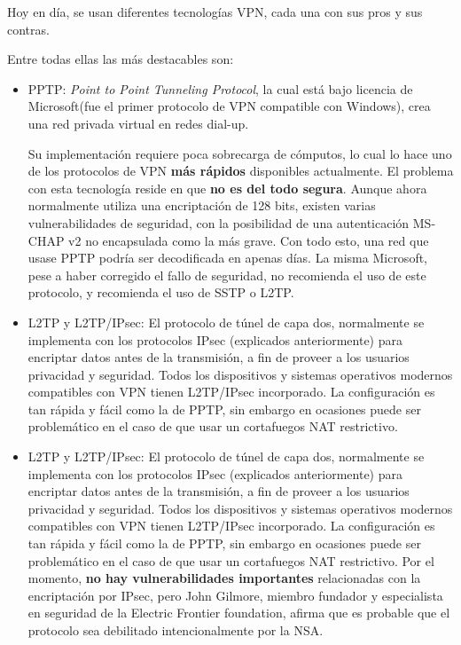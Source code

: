  Hoy en día, se usan diferentes tecnologías VPN, cada una con sus pros y sus contras.
 
 Entre todas ellas las más destacables son:
 
 \begin{itemize}
 	\item PPTP: \textit{Point to Point Tunneling Protocol}, la cual está bajo licencia de Microsoft(fue el primer protocolo de VPN compatible con Windows), crea una red privada virtual en redes dial-up. 
 	
 	Su implementación requiere poca sobrecarga de cómputos, lo cual lo hace uno de los protocolos de VPN \textbf{más rápidos} disponibles actualmente.
 	El problema con esta tecnología reside en que \textbf{no es del todo segura}. Aunque ahora normalmente utiliza una encriptación de 128 bits, existen varias vulnerabilidades de seguridad, con la posibilidad de una autenticación MS-CHAP v2 no encapsulada como la más grave. Con todo esto, una red que usase PPTP podría ser decodificada en apenas días.
 	La misma Microsoft, pese a haber corregido el fallo de seguridad, no recomienda el uso de este protocolo, y recomienda el uso de SSTP o L2TP.
 	
 	\item L2TP y L2TP/IPsec: El protocolo de túnel de capa dos, normalmente se implementa con los protocolos IPsec (explicados anteriormente) para encriptar datos antes de la transmisión, a fin de proveer a los usuarios privacidad y seguridad. Todos los dispositivos y sistemas operativos modernos compatibles con VPN tienen L2TP/IPsec incorporado. La configuración es tan rápida y fácil como la de PPTP, sin embargo en ocasiones puede ser problemático en el caso de que usar un cortafuegos NAT restrictivo.
 	
 	\item L2TP y L2TP/IPsec: El protocolo de túnel de capa dos, normalmente se implementa con los protocolos IPsec (explicados anteriormente) para encriptar datos antes de la transmisión, a fin de proveer a los usuarios privacidad y seguridad. Todos los dispositivos y sistemas operativos modernos compatibles con VPN tienen L2TP/IPsec incorporado. La configuración es tan rápida y fácil como la de PPTP, sin embargo en ocasiones puede ser problemático en el caso de que usar un cortafuegos NAT restrictivo.
 	Por el momento, \textbf{no hay vulnerabilidades importantes }relacionadas con la encriptación por IPsec, pero John Gilmore,  miembro fundador y especialista en seguridad de la Electric Frontier foundation, afirma que es probable que el protocolo sea debilitado intencionalmente por la NSA.
 	

\end{itemize}
